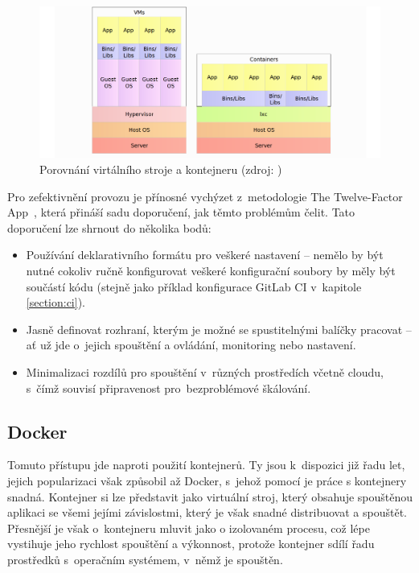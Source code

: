 \documentclass[FM,DP]{tulthesis}
\begin{document}
\begin{figure}[h]
\center
\includegraphics[width=\textwidth]{container-vs-vm.png}
\caption{Porovnání virtálního stroje a kontejneru (zdroj: \cite[strana~68]{devops})}
\label{container-vs-vm}
\end{figure}

Pro zefektivnění provozu je přínosné vychýzet z~metodologie The Twelve-Factor App~\cite{12factor}, 
která přináší sadu doporučení, jak těmto problémům čelit. Tato doporučení lze shrnout do několika bodů:

\begin{itemize}
\item Používání deklarativního formátu pro veškeré nastavení -- nemělo by být nutné cokoliv ručně konfigurovat
veškeré konfigurační soubory by měly být součástí kódu (stejně jako příklad konfigurace GitLab CI v~kapitole
\ref{section:ci}).
\item Jasně definovat rozhraní, kterým je možné se spustitelnými balíčky pracovat -- ať už jde o~jejich spouštění
a ovládání, monitoring nebo nastavení.
\item Minimalizaci rozdílů pro spouštění v~různých prostředích včetně cloudu, s~čímž souvisí připravenost
pro~bezproblémové škálování.
\end{itemize}

\subsection{Docker}

Tomuto přístupu jde naproti použití kontejnerů. Ty jsou k~dispozici již řadu let, jejich popularizaci však
způsobil až Docker, s~jehož pomocí je práce s kontejnery snadná. Kontejner si lze představit jako virtuální
stroj, který obsahuje spouštěnou aplikaci se všemi jejími závislostmi, který je však snadné distribuovat a
spouštět. Přesnější je však o~kontejneru mluvit jako o izolovaném procesu, což lépe vystihuje jeho rychlost
spouštění a výkonnost, protože kontejner sdílí řadu prostředků s~operačním systémem, v~němž je spouštěn.
\end{document}
